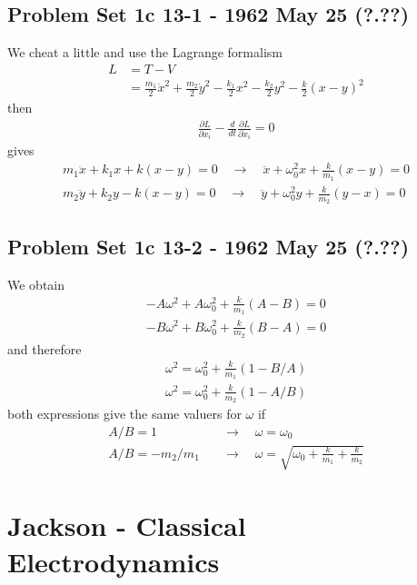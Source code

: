 \documentclass[10pt,a4paper]{book}
\theoremstyle{definition}
\begin{document}
\subsection{Problem Set 1c 13-1 - 1962 May 25 (?.??)}
We cheat a little and use the Lagrange formalism 
\begin{align}
L&=T-V\\
&=\frac{m_1}{2}\dot{x}^2+\frac{m_2}{2}\dot{y}^2-\frac{k_1}{2}x^2-\frac{k_2}{2}y^2-\frac{k}{2}(x-y)^2
\end{align}
then
\begin{align}
\frac{\partial L}{\partial x_i}-\frac{d}{dt}\frac{\partial L}{\partial\dot{x}_i}=0
\end{align}
gives
\begin{align}
m_1\ddot{x}+k_1x+k(x-y)=0\quad\rightarrow\quad \ddot{x}+\omega_0^2x+\frac{k}{m_1}(x-y)=0\\
m_2\ddot{y}+k_2y-k(x-y)=0\quad\rightarrow\quad \ddot{y}+\omega_0^2y+\frac{k}{m_2}(y-x)=0
\end{align}


\subsection{Problem Set 1c  13-2 - 1962 May 25 (?.??)}
We obtain
\begin{align}
-A\omega^2+A\omega_0^2+\frac{k}{m_1}(A-B)=0\\
-B\omega^2+B\omega_0^2+\frac{k}{m_2}(B-A)=0
\end{align}
and therefore
\begin{align}
\omega^2=\omega_0^2+\frac{k}{m_1}(1-B/A)\\
\omega^2=\omega_0^2+\frac{k}{m_2}(1-A/B)
\end{align}
both expressions give the same valuers for $\omega$ if
\begin{align}
A/B=1\quad&\rightarrow\quad \omega=\omega_0\\
A/B=-m_2/m_1\quad&\rightarrow\quad \omega=\sqrt{\omega_0+\frac{k}{m_1}+\frac{k}{m_2}}
\end{align} 




\section{{\sc Jackson} - Classical Electrodynamics}
\end{document}
